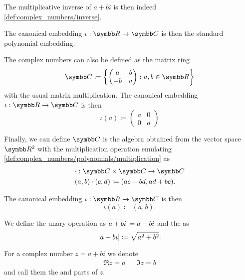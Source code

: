 \begin{definition}
\begin{defenum}
    The multiplicative inverse of \( a + bi \) is then indeed \cref{def:complex_numbers/inverse}.

    The canonical embedding \( \iota: \R \to \C \) is then the standard polynomial embedding.

     The complex numbers can also be defined as the matrix ring
    \begin{equation*}
      \C \coloneqq \left\{
        \begin{pmatrix}
          a & b \\
          -b & a
        \end{pmatrix}
      \colon a, b \in \R \right\}
    \end{equation*}
    with the usual matrix multiplication. The canonical embedding \( \iota: \R \to \C \) is then
    \begin{equation*}
      \iota(a) \coloneqq \begin{pmatrix}
        a & 0 \\
        0 & a
      \end{pmatrix}
    \end{equation*}

     Finally, we can define \( \C \) is the algebra obtained from the vector space \( \R^2 \) with the multiplication operation emulating \cref{def:complex_numbers/polynomials/multiplication} as
    \begin{align*}
      &\cdot: \C \times \C \to \C \\
      &(a, b) \cdot (c, d) \coloneqq (ac - bd, ad + bc).
    \end{align*}

    The canonical embedding \( \iota: \R \to \C \) is then
    \begin{equation*}
      \iota(a) \coloneqq (a, b).
    \end{equation*}
  \end{defenum}

  We define the unary  operation as \( \overline{a + bi} \coloneqq a - bi \) and the  as
  \begin{equation*}
    \left\vert a + bi \right\vert \coloneqq \sqrt{a^2 + b^2}.
  \end{equation*}

  For a complex number \( z = a + bi \) we denote
  \begin{align*}
    \Re z = a && \Im z = b
  \end{align*}
  and call them the  and  parts of \( z \).
\end{definition}

